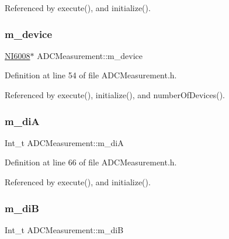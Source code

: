 Referenced by execute(), and initialize().

\mbox{\label{classADCMeasurement_afc825cc28b05894a0f762452459988e1}} 
\subsubsection{\texorpdfstring{m\+\_\+device}{m\_device}}
{\footnotesize\ttfamily \hyperlink{classNI6008}{N\+I6008}$\ast$ A\+D\+C\+Measurement\+::m\+\_\+device\hspace{0.3cm}{\ttfamily [private]}}



Definition at line 54 of file A\+D\+C\+Measurement.\+h.



Referenced by execute(), initialize(), and number\+Of\+Devices().

\mbox{\label{classADCMeasurement_ae024ec8553b7ea765af8668ab5e95699}} 
\subsubsection{\texorpdfstring{m\+\_\+diA}{m\_diA}}
{\footnotesize\ttfamily Int\+\_\+t A\+D\+C\+Measurement\+::m\+\_\+diA\hspace{0.3cm}{\ttfamily [private]}}



Definition at line 66 of file A\+D\+C\+Measurement.\+h.



Referenced by execute(), and initialize().

\mbox{\label{classADCMeasurement_a9d04a602dda58b9fd65acf4a0a7de9a3}} 
\subsubsection{\texorpdfstring{m\+\_\+diB}{m\_diB}}
{\footnotesize\ttfamily Int\+\_\+t A\+D\+C\+Measurement\+::m\+\_\+diB\hspace{0.3cm}{\ttfamily [private]}}



